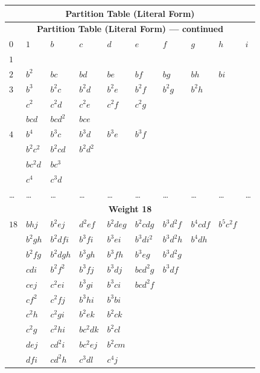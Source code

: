\documentclass[11pt,a4paper]{book}
\begin{document}
\begin{center}
\small
\begin{longtable}{|l|l|l|l|l|l|l|l|l|l|}
\hline
\multicolumn{10}{|c|}{\textbf{Partition Table (Literal Form)}} \\
\hline
\endfirsthead
\hline
\multicolumn{10}{|c|}{\textbf{Partition Table (Literal Form) --- continued}} \\
\hline
\endhead
\hline
\endfoot
$0$ & $1$ & $b$ & $c$ & $d$ & $e$ & $f$ & $g$ & $h$ & $i$ \\
\hline
$1$ & & & & & & & & & \\
\hline
$2$ & $b^2$ & $bc$ & $bd$ & $be$ & $bf$ & $bg$ & $bh$ & $bi$ & \\
\hline
$3$ & $b^3$ & $b^2c$ & $b^2d$ & $b^2e$ & $b^2f$ & $b^2g$ & $b^2h$ & & \\
  & $c^2$ & $c^2d$ & $c^2e$ & $c^2f$ & $c^2g$ & & & & \\
  & $bcd$ & $bcd^2$ & $bce$ & & & & & & \\
\hline
$4$ & $b^4$ & $b^3c$ & $b^3d$ & $b^3e$ & $b^3f$ & & & & \\
  & $b^2c^2$ & $b^2cd$ & $b^2d^2$ & & & & & & \\
  & $bc^2d$ & $bc^3$ & & & & & & & \\
  & $c^4$ & $c^3d$ & & & & & & & \\
\hline
\dots & \dots & \dots & \dots & \dots & \dots & \dots & \dots & \dots & \dots \\
\hline
\multicolumn{10}{|c|}{\textbf{Weight 18}} \\
\hline
$18$ & $bhj$ & $b^2ej$ & $d^2ef$ & $b^2deg$ & $b^2cdg$ & $b^3d^2f$ & $b^4cdf$ & $b^5c^2f$ & \\
   & $b^2gh$ & $b^2dfi$ & $b^3fi$ & $b^3ei$ & $b^3di^2$ & $b^3d^2h$ & $b^4dh$ & & \\
   & $b^2fg$ & $b^2dgh$ & $b^3gh$ & $b^3fh$ & $b^3eg$ & $b^3d^2g$ & & & \\
   & $cdi$ & $b^2f^2$ & $b^3fj$ & $b^3dj$ & $bcd^2g$ & $b^3df$ & & & \\
   & $cej$ & $c^2ei$ & $b^3gi$ & $b^3ci$ & $bcd^2f$ & & & & \\
   & $cf^2$ & $c^2fj$ & $b^3hi$ & $b^3bi$ & & & & & \\
   & $c^2h$ & $c^2gi$ & $b^2ek$ & $b^2ck$ & & & & & \\
   & $c^2g$ & $c^2hi$ & $bc^2dk$ & $b^2cl$ & & & & & \\
   & $dej$ & $cd^2i$ & $bc^2ej$ & $b^2cm$ & & & & & \\
   & $dfi$ & $cd^2h$ & $c^3dl$ & $c^4j$ & & & & & \\
\hline
\end{longtable}
\end{center}
\end{document}

